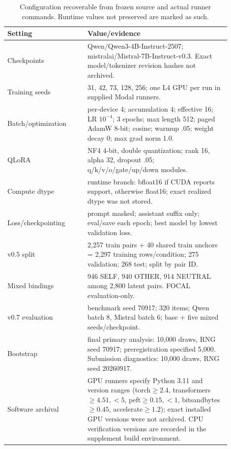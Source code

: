 \documentclass{article}
\begin{document}
\begin{table}[h]
\caption{Configuration recoverable from frozen source and actual runner commands. Runtime values not preserved are marked as such.}
\scriptsize
\begin{center}
\begin{tabular}{p{0.32\linewidth}p{0.58\linewidth}}
\toprule
Setting & Value/evidence \\
\midrule
Checkpoints & Qwen/Qwen3-4B-Instruct-2507; mistralai/Mistral-7B-Instruct-v0.3. Exact model/tokenizer revision hashes not archived. \\
Training seeds & 31, 42, 73, 128, 256; one L4 GPU per run in supplied Modal runners. \\
Batch/optimization & per-device 4; accumulation 4; effective 16; LR $10^{-4}$; 3 epochs; max length 512; paged AdamW 8-bit; cosine; warmup .05; weight decay 0; max grad norm 1.0. \\
QLoRA & NF4 4-bit, double quantization; rank 16, alpha 32, dropout .05; q/k/v/o/gate/up/down modules. \\
Compute dtype & runtime branch: bfloat16 if CUDA reports support, otherwise float16; exact realized dtype was not stored. \\
Loss/checkpointing & prompt masked; assistant suffix only; eval/save each epoch; best model by lowest validation loss. \\
v0.5 split & 2,257 train pairs + 40 shared train anchors = 2,297 training rows/condition; 275 validation; 268 test; split by pair ID. \\
Mixed bindings & 946 SELF, 940 OTHER, 914 NEUTRAL among 2,800 latent pairs. FOCAL evaluation-only. \\
v0.7 evaluation & benchmark seed 70917; 320 items; Qwen batch 8, Mistral batch 6; base + five mixed seeds/checkpoint. \\
Bootstrap & final primary analysis: 10,000 draws, RNG seed 70917; preregistration specified 5,000. Submission diagnostics: 10,000 draws, RNG seed 20260917. \\
Software archival & GPU runners specify Python 3.11 and version ranges (torch$\ge2.4$, transformers$\ge4.51,<5$, peft$\ge0.15,<1$, bitsandbytes$\ge0.45$, accelerate$\ge1.2$); exact installed GPU versions were not archived. CPU verification versions are recorded in the supplement build environment. \\
\bottomrule
\end{tabular}
\end{center}
\end{table}
\end{document}
